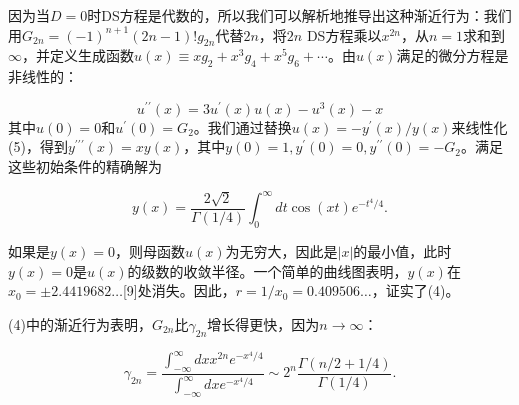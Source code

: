 \documentclass[UTF8]{article}
\begin{document}
因为当\( D=0 \)时DS方程是代数的，所以我们可以解析地推导出这种渐近行为：我们用\( G_{2 n}=(-1)^{n+1}(2 n-1) ! g_{2 n} \)代替\( 2 n \)，将\( 2 n \) DS方程乘以\( x^{2 n} \)，从\( n=1 \)求和到\( \infty \)，并定义生成函数\( u(x) \equiv x g_{2}+x^{3} g_{4}+x^{5} g_{6}+\cdots \)。由\( u(x) \)满足的微分方程是非线性的：




\[u^{\prime \prime}(x)=3 u^{\prime}(x) u(x)-u^{3}(x)-x
\]其中\( u(0)=0 \)和\( u^{\prime}(0)=G_{2} \)。我们通过替换\( u(x)=-y^{\prime}(x) / y(x) \)来线性化(5)，得到\( y^{\prime \prime \prime}(x)=x y(x) \)，其中\( y(0)=1, y^{\prime}(0)=0, y^{\prime \prime}(0)=-G_{2} \)。满足这些初始条件的精确解为




\[y(x)=\frac{2 \sqrt{2}}{\Gamma(1 / 4)} \int_{0}^{\infty} d t \cos (x t) e^{-t^{4} / 4} .
\]


如果是\( y(x)=0 \)，则母函数\( u(x) \)为无穷大，因此是\( |x| \)的最小值，此时\( y(x)=0 \)是\( u(x) \)的级数的收敛半径。一个简单的曲线图表明，\( y(x) \)在\( x_{0}= \pm 2.4419682 \ldots \)[9]处消失。因此，\( r=1 / x_{0}=0.409506 \ldots \)，证实了(4)。



(4)中的渐近行为表明，\( G_{2 n} \)比\( \gamma_{2 n} \)增长得更快，因为\( n \rightarrow \infty \)：


\[
\gamma_{2 n}=\frac{\int_{-\infty}^{\infty} d x x^{2 n} e^{-x^{4} / 4}}{\int_{-\infty}^{\infty} d x e^{-x^{4} / 4}} \sim 2^{n} \frac{\Gamma(n / 2+1 / 4)}{\Gamma(1 / 4)} .
\]
\end{document}
